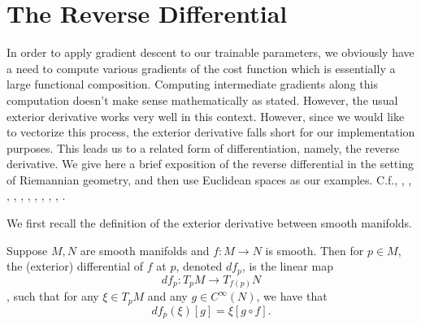 


\section{The Reverse Differential}

In order to apply gradient descent to our trainable parameters, we obviously have a need to compute various gradients of the cost function which is essentially a large functional composition.  Computing intermediate gradients along this computation doesn't make sense mathematically as stated.  However, the usual exterior derivative works very well in this context.  However, since we would like to vectorize this process, the exterior derivative falls short for our implementation purposes.  This leads us to a related form of differentiation, namely, the reverse derivative.  We give here a brief exposition of the reverse differential in the setting of Riemannian geometry, and then use Euclidean spaces as our examples.  C.f.,  \cite{barendregt1988introduction}, \cite{blute2009cartesian}, \cite{cockett2019reverse}, \cite{cruttwell2022categorical}, \cite{fong2019backprop}, \cite{gavranovic2019compositional},  \cite{mac2013categories}, \cite{mak2020differential}, \cite{selinger2010survey}, \cite{shiebler2021category}, \cite{wengert1964simple}.

We first recall the definition of the exterior derivative between smooth manifolds.
\begin{defn}
	Suppose $M,N$ are smooth manifolds and $f:M\to N$ is smooth.  Then for $p\in M$, the (exterior) differential of $f$ at $p$, denoted $df_p$, is the linear map
	$$df_p:T_pM\to T_{f(p)}N$$,
	such that for any $\xi\in T_pM$ and any $g\in C^\infty(N)$, we have that
	$$df_p(\xi)[g]=\xi[g\circ f].$$
\end{defn}

